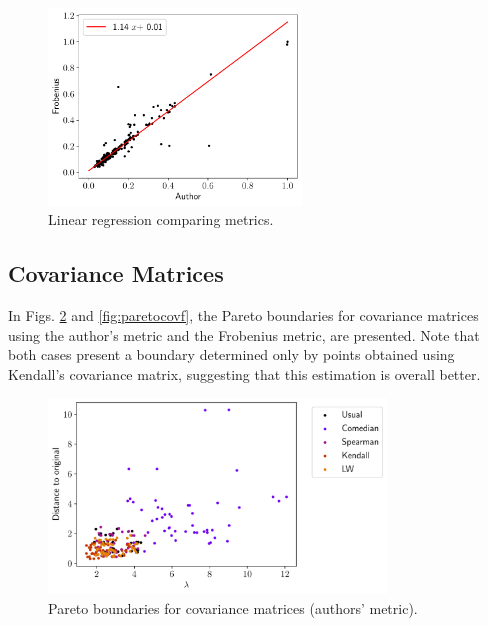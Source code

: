\documentclass[11pt]{article}
\theoremstyle{definition}
\theoremstyle{remark}
\theoremstyle{remark}
\theoremstyle{remark}
\begin{document}
\begin{figure}[H]
    \centering
    \includegraphics[width=0.6\textwidth]{figs/linear.pdf}
    \caption{Linear regression comparing metrics.}
    \label{fig:linear}
\end{figure}

\subsection{Covariance Matrices}

In Figs. \ref{fig:paretocova} and \ref{fig:paretocovf}, the Pareto boundaries for covariance matrices using the author's metric and the Frobenius metric, are presented. Note that both cases present a boundary determined only by points obtained using Kendall's covariance matrix, suggesting that this estimation is overall better.

\begin{figure}[H]
    \centering
    \includegraphics[width=0.8\textwidth]{figs/author-scatter.pdf}
    \caption{Pareto boundaries for covariance matrices (authors' metric).}
    \label{fig:paretocova}
\end{figure}
\end{document}
